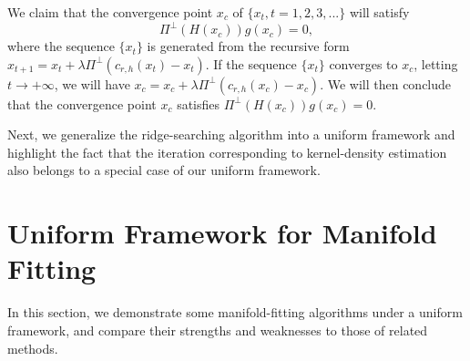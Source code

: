 \documentclass[aos,preprint]{imsart}
\theoremstyle{remark}
\begin{document}
\begin{appendix}
We claim that the convergence point $x_c$ of $\{x_t, t=1,2,3,...\}$ will satisfy 
\[
\Pi^{\perp}(H(x_c)) g(x_c)=0,
\] where the sequence $\{x_t\}$ is generated from the recursive form $x_{t+1} = x_t + \lambda \Pi^\perp (c_{r,h}(x_t) - x_t)$. If the sequence $\{x_t\}$ converges to $x_c$, letting $t \rightarrow +\infty$, we will have $x_c = x_c + \lambda \Pi^\perp (c_{r,h}(x_c) - x_c)$. We will then conclude that the convergence point $x_c$ satisfies $\Pi^{\perp}(H(x_c)) g(x_c)=0$.



Next, we generalize the ridge-searching algorithm into a uniform framework and highlight the fact that the iteration corresponding to kernel-density estimation also belongs to a special case of our uniform framework.

\section{Uniform Framework for Manifold Fitting}\label{Uniform_Framework}

In this section, we demonstrate some manifold-fitting algorithms under a uniform framework, and compare their strengths and weaknesses to those of related methods.




\end{appendix}
\end{document}

